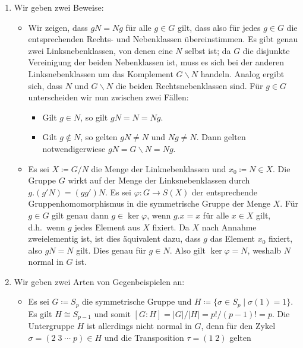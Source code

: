 \begin{solution}
  \begin{enumerate}
    \item
      Wir geben zwei Beweise:
      \begin{itemize}
        \item
          Wir zeigen, dass $gN = Ng$ für alle $g \in G$ gilt, dass also für jedes $g \in G$ die entsprechenden Rechts- und Nebenklassen übereinstimmen.
          Es gibt genau zwei Linksnebenklassen, von denen eine $N$ selbst ist;
          da $G$ die disjunkte Vereinigung der beiden Nebenklassen ist, muss es sich bei der anderen Linksnebenklassen um das Komplement $G \smallsetminus N$ handeln.
          Analog ergibt sich, dass $N$ und $G \smallsetminus N$ die beiden Rechtsnebenklassen sind.
          Für $g \in G$ unterscheiden wir nun zwischen zwei Fällen:
          \begin{itemize}
            \item
              Gilt $g \in N$, so gilt $gN = N = Ng$.
            \item
              Gilt $g \notin N$, so gelten $gN \neq N$ und $Ng \neq N$.
              Dann gelten notwendigerwiese $gN = G \smallsetminus N = Ng$.
          \end{itemize}
        \item
          Es sei $X \coloneqq G/N$ die Menge der Linknebenklassen und $x_0 \coloneqq N \in X$.
          Die Gruppe $G$ wirkt auf der Menge der Linksnebenklassen  durch $g.(g'N) = (gg')N$.
          Es sei $\varphi \colon G \to S(X)$ der entsprechende Gruppenhomomorphismus in die symmetrische Gruppe der Menge $X$.
          Für $g \in G$ gilt genau dann $g \in \ker \varphi$, wenn $g.x = x$ für alle $x \in X$ gilt, d.h.\ wenn $g$ jedes Element aus $X$ fixiert.
          Da $X$ nach Annahme zweielementig ist, ist dies äquivalent dazu, dass $g$ das Element $x_0$ fixiert, also $gN = N$ gilt.
          Dies genau für $g \in N$.
          Also gilt $\ker \varphi = N$, weshalb $N$ normal in $G$ ist.
      \end{itemize}
    \item
      Wir geben zwei Arten von Gegenbeispielen an:
      \begin{itemize}
        \item
          Es sei $G \coloneqq S_p$ die symmetrische Gruppe und $H \coloneqq \{\sigma \in S_p \mid \sigma(1) = 1\}$.
          Es gilt $H \cong S_{p-1}$ und somit $[G : H] = |G|/|H| = p!/(p-1)! = p$.
          Die Untergruppe $H$ ist allerdings nicht normal in $G$, denn für den Zykel $\sigma = (2 \; 3 \; \dotsb \; p) \in H$ und die Transposition $\tau = (1 \; 2)$ gelten

\end{itemize}
\end{enumerate}
\end{solution}
